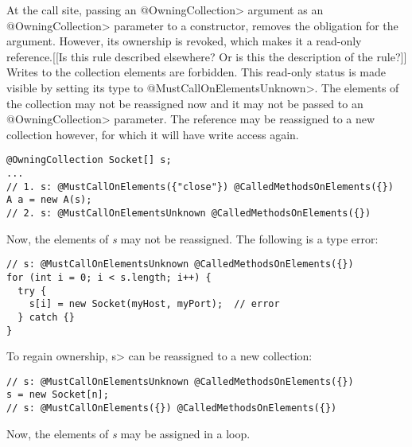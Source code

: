 
At the call site, passing an \<@OwningCollection> argument as an
\<@OwningCollection> parameter to a constructor, removes the obligation for
the argument. However, its ownership is revoked, which makes it a read-only
reference.[[Is this rule described elsewhere?  Or is this the description of the
rule?]] Writes to the collection elements are forbidden. This read-only
status is made visible by setting its \MustCallOnElements type to
\<@MustCallOnElementsUnknown>. The elements of the collection may not be
reassigned now and it may not be passed to an \<@OwningCollection>
parameter. The reference may be reassigned to a new collection however, for
which it will have write access again.

\begin{verbatim}
@OwningCollection Socket[] s;
...
// 1. s: @MustCallOnElements({"close"}) @CalledMethodsOnElements({})
A a = new A(s);
// 2. s: @MustCallOnElementsUnknown @CalledMethodsOnElements({})
\end{verbatim}

Now, the elements of \textit{s} may not be reassigned. The following is a type error:

\begin{verbatim}
// s: @MustCallOnElementsUnknown @CalledMethodsOnElements({})
for (int i = 0; i < s.length; i++) {
  try {
    s[i] = new Socket(myHost, myPort);  // error
  } catch {}
}
\end{verbatim}

To regain ownership, \<s> can be reassigned to a new collection:

\begin{verbatim}
// s: @MustCallOnElementsUnknown @CalledMethodsOnElements({})
s = new Socket[n];
// s: @MustCallOnElements({}) @CalledMethodsOnElements({})
\end{verbatim}

Now, the elements of \textit{s} may be assigned in a loop.



